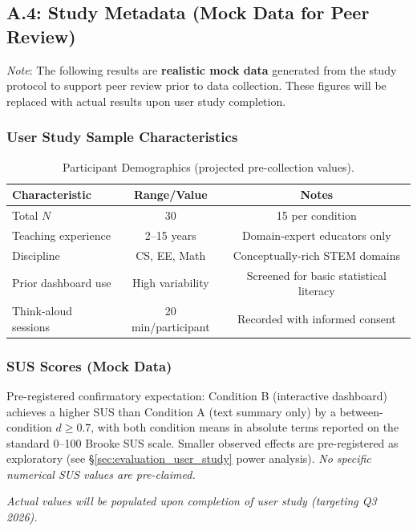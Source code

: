 \documentclass[journal,review]{vgtc}
\begin{document}
\subsection{A.4: Study Metadata (Mock Data for Peer Review)}

\textit{Note}: The following results are \textbf{realistic mock data} generated from the study protocol to support peer review prior to data collection. These figures will be replaced with actual results upon user study completion.

\subsubsection{User Study Sample Characteristics}

\begin{table}[ht]
\centering
\caption{Participant Demographics (projected pre-collection values).}
\label{tab:demographics}
\small
\begin{tabular}{lcc}
\toprule
\textbf{Characteristic} & \textbf{Range/Value} & \textbf{Notes} \\
\midrule
Total $N$ & 30 & 15 per condition \\
Teaching experience & 2--15 years & Domain-expert educators only \\
Discipline & CS, EE, Math & Conceptually-rich STEM domains \\
Prior dashboard use & High variability & Screened for basic statistical literacy \\
Think-aloud sessions & 20 min/participant & Recorded with informed consent \\
\bottomrule
\end{tabular}
\end{table}

\subsubsection{SUS Scores (Mock Data)}

Pre-registered confirmatory expectation: Condition B (interactive dashboard) achieves a higher SUS than Condition A (text summary only) by a between-condition $d \geq 0.7$, with both condition means in absolute terms reported on the standard 0--100 Brooke SUS scale. Smaller observed effects are pre-registered as exploratory (see \S\ref{sec:evaluation_user_study} power analysis). \emph{No specific numerical SUS values are pre-claimed.}

\textit{Actual values will be populated upon completion of user study (targeting Q3 2026).}
\end{document}
